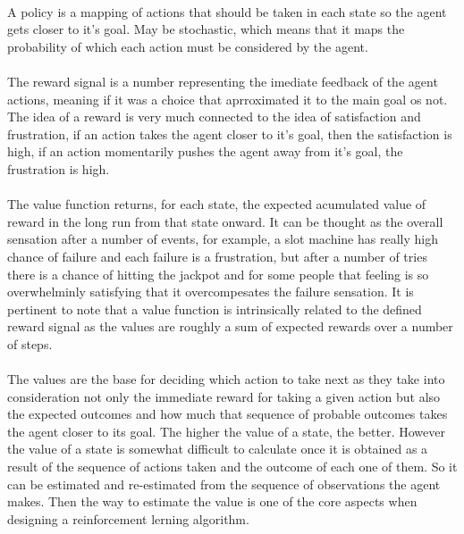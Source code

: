 \documentclass{article}
\begin{document}
\paragraph{}
A policy is a mapping of actions that should be taken in each state so the agent gets closer to it's goal. May be stochastic, which means that it maps the probability of which each action must be considered by the agent.
\paragraph{}
The reward signal is a number representing the imediate feedback of the agent actions, meaning if it was a choice that aprroximated it to the main goal os not. The idea of a reward is very much connected to the idea of satisfaction and frustration, if an action takes the agent closer to it's goal, then the satisfaction is high, if an action momentarily pushes the agent away from it's goal, the frustration is high.
\paragraph{}
The value function returns, for each state, the expected acumulated value of reward in the long run from that state onward. It can be thought as the overall sensation after a number of events, for example, a slot machine has really high chance of failure and each failure is a frustration, but after a number of tries there is a chance of hitting the jackpot and for some people that feeling is so overwhelminly satisfying that it overcompesates the failure sensation. It is pertinent to note that a value function is intrinsically related to the defined reward signal as the values are roughly a sum of expected rewards over a number of steps.
\paragraph{}
The values are the base for deciding which action to take next as they take into consideration not only the immediate reward for taking a given action but also the expected outcomes and how much that sequence of probable outcomes takes the agent closer to its goal. The higher the value of a state, the better. However the value of a state is somewhat difficult to calculate once it is obtained as a result of the sequence of actions taken and the outcome of each one of them. So it can be estimated and re-estimated from the sequence of observations the agent makes. Then the way to estimate the value is one of the core aspects when designing a reinforcement lerning algorithm.
\end{document}
